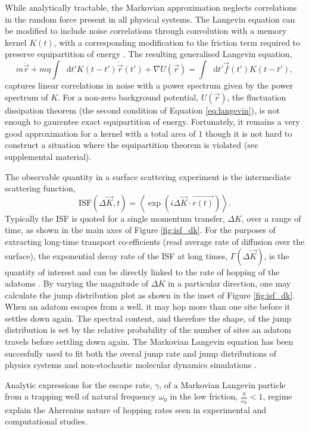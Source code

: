 \documentclass[7pt]{article}
\newcommand*{\diff}{\mathop{}\!\mathrm{d}}
\begin{document}
While analytically tractable, the Markovian approximation neglects correlations in the random force present in all physical systems. The Langevin equation can be modified to include noise correlations through convolution with a memory kernel $K(t)$, with a corresponding modification to the friction term required to preserve equipartition of energy \cite{Kubo}. The resulting generalised Langevin equation, 
\begin{equation}
	m\ddot{\vec{r}}+m\eta\int\diff{t'}K(t-t')\dot{\vec{r}}(t')+\nabla U(\vec{r})=\int\diff{t'}\vec{f}(t')K(t-t'),
	\label{eq:gle}
\end{equation}
captures linear correlations in noise with a power spectrum given by the power spectrum of $K$. For a non-zero background potential, $U(\vec{r})$, the fluctuation dissipation theorem (the second condition of Equation \ref{eq:langevin}), is not enough to gaurentee exact equipartition of energy. Fortunately, it remains a very good approximation for a kernel with a total area of $1$ though it is not hard to construct a situation where the equipartition theorem is violated (see supplemental material). 

The observable quantity in a surface scattering experiment is the intermediate scattering function,
$$
\mathrm{ISF}(\Delta{\vec{K}}, t) = \left<\exp\left(i\Delta{\vec{K}}\cdot\vec{r(t)}\right)\right>.
$$
Typically the ISF is quoted for a single momentum transfer, $\Delta{K}$, over a range of time, as shown in the main axes of Figure \ref{fig:isf_dk}. For the purposes of extracting long-time transport co-efficients (read average rate of diffusion over the surface), the exponential decay rate of the ISF at long times, $\Gamma(\Delta{\vec{K}})$, is the quantity of interest and can be directly linked to the rate of hopping of the adatoms \cite{Chudley}. By varying the magnitude of $\Delta{K}$ in a particular direction, one may calculate the jump distribution plot as shown in the inset of Figure \ref{fig:isf_dk}. When an adatom escapes from a well, it may hop more than one site before it settles down again. The spectral content, and therefore the shape, of the jump distribution is set by the relative probability of the number of sites an adatom travels before settling down again. The Markovian Langevin equation has been succesfully used to fit both the overal jump rate and jump distributions of physics systems \cite{Alexandrowicz, Hedgeland, Jardine} and non-stochastic molecular dynamics simulations \cite{Diamant}. 

Analytic expressions for the escape rate, $\gamma$, of a Markovian Langevin particle from a trapping well of natural frequency $\omega_0$ in the low friction, $\frac{\eta}{\omega_0} < 1$, regime explain the Ahrrenius nature of hopping rates seen in experimental and computational studies. 
\end{document}
